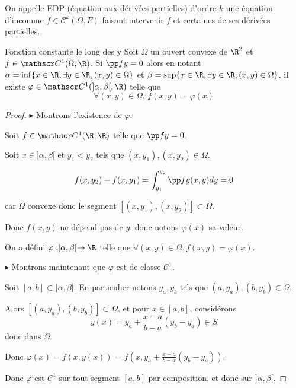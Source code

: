On appelle EDP (équation aux dérivées partielles) d'ordre $k$ une équation d'inconnue $f \in \mathscr C^k(\Omega, F)$
faisant intervenir $f$ et certaines de ses dérivées partielles. 

\begin{theoreme}{Fonction constante le long des y}{}
    Soit $\Omega$ un ouvert convexe de $\R^2$ et $f \in \mathscr C^1(\Omega, \R)$.
    Si $\pp f y = 0$ alors en notant $\alpha = \inf \{x \in \R, \exists y \in \R, (x, y) \in \Omega\}$
    et $\beta = \sup \{x \in \R, \exists y \in \R, (x, y) \in \Omega\}$, il existe
    $\varphi \in \mathscr C^1(]\alpha, \beta[, \R)$ telle que
    $$\forall (x, y) \in \Omega, \, f(x, y) = \varphi(x)$$
\end{theoreme}


\begin{proof}
    $\blacktriangleright$ Montrons l'existence de $\varphi$.
    
    Soit $f \in \mathscr C^1(\R, \R)$ telle que $\pp f y = 0$.

    Soit $x \in ] \alpha, \beta [$ et $y_1 < y_2$ tels que $(x, y_1), (x, y_2) \in \Omega$.

    $$ f(x, y_2) - f(x, y_1) = \int_{y_1}^{y_2} \pp f y (x, y) dy = 0$$
    
    car $\Omega$ convexe donc le segment $[(x, y_1), (x, y_2)] \subset \Omega$.

    Donc $f(x, y)$ ne dépend pas de $y$, donc notons $\varphi(x)$ sa valeur. 

    On a défini $\varphi : ]\alpha, \beta[ \to \R$ telle que 
    $\forall (x, y) \in \Omega, f(x, y) = \varphi(x)$.

    \lvspace 


    \lvspace \avspace

    $\blacktriangleright$ Montrons maintenant que $\varphi$ est de classe $\mathscr C^1$.

    Soit $[a, b] \subset ]\alpha, \beta[$. En particulier notons 
    $y_a, y_b$ tels que $(a, y_a), (b, y_b) \in \Omega$.

    Alors $[(a, y_a), (b, y_b)] \subset \Omega$, et pour $x \in [a, b]$, considérons 
    $$y(x) = y_a + \frac{x - a }{ b - a } (y_b - y_a) \in S$$ donc dans $\Omega$

    Donc $\varphi(x) = f(x, y(x))$ = $f\left(x, y_a + \frac{x - a }{ b - a } (y_b - y_a) \right)$.

    Donc $\varphi$ est $ \mathscr C^1$ sur tout segment $[a, b]$ par composition, et donc sur $]\alpha, \beta[$.
\end{proof}

